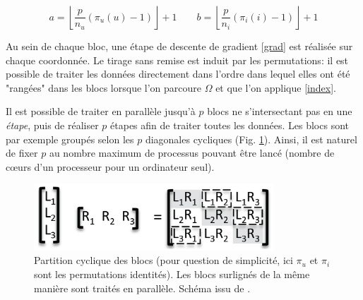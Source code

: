 \documentclass[10pt,a4paper]{article}
\begin{document}
\begin{equation}\label{index}
a=\left \lfloor \frac{p}{n_u}(\pi_u(u)-1) \right \rfloor +1 \quad \quad b=\left \lfloor \frac{p}{n_i}(\pi_i(i)-1) \right \rfloor +1
\end{equation}

Au sein de chaque bloc, une étape de descente de gradient \eqref{grad} est réalisée sur chaque coordonnée. Le tirage sans remise est induit par les permutations: il est possible de traiter les données directement dans l'ordre dans lequel elles ont été "rangées" dans les blocs lorsque l'on parcoure $\Omega$ et que l'on applique \eqref{index}.

Il est possible de traiter en parallèle jusqu'à $p$ blocs ne s'intersectant pas en une \emph{étape}, puis de réaliser $p$ étapes afin de traiter toutes les données. Les blocs sont par exemple groupés selon les $p$ diagonales cycliques (Fig. \ref{blocs}). Ainsi, il est naturel de fixer $p$ au nombre maximum de processus pouvant être lancé (nombre de cœurs d'un processeur pour un ordinateur seul).

\begin{figure}
\centering
\includegraphics[width=0.8\textwidth]{fig/blocs}
\caption{Partition cyclique des blocs (pour question de simplicité, ici $\pi_u$ et $\pi_i$ sont les permutations identités). Les blocs surlignés de la même manière sont traités en parallèle. Schéma issu de \cite{jelly}.}
\label{blocs}
\end{figure}
\end{document}
